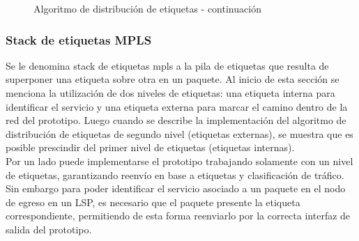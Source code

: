\newpage
\begin{figure}[ht!]
\begin{algorithm}[H]
\end{algorithm}
\caption[]{Algoritmo de distribución de etiquetas - continuación}
\end{figure}

\subsubsection{Stack de etiquetas MPLS}
Se le denomina stack de etiquetas mpls a la pila de etiquetas que resulta de superponer una etiqueta sobre otra en un paquete. Al inicio de esta secci\'on se menciona la utilizaci\'on de dos niveles de etiquetas: una etiqueta interna para identificar el servicio y una etiqueta externa para marcar el camino dentro de la red del prototipo. Luego cuando se describe la implementaci\'on del algoritmo de distribución de etiquetas de segundo nivel (etiquetas externas), se muestra que es posible prescindir del primer nivel de etiquetas (etiquetas internas).\\

Por un lado puede implementarse el prototipo trabajando solamente con un nivel de etiquetas, garantizando reenvío en base a etiquetas y clasificaci\'on de tr\'afico. Sin embargo para poder identificar el servicio asociado a un paquete en el nodo de egreso en un LSP, es necesario que el paquete presente la etiqueta correspondiente, permitiendo de esta forma reenviarlo por la correcta interfaz de salida del prototipo. 

